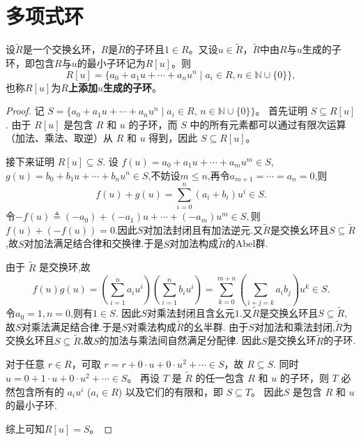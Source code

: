\documentclass[../../main.tex]{subfiles}%
\begin{document}
\section{多项式环}

\begin{theorem}
设\( \widetilde{R} \)是一个交换幺环，\( R \)是\( \widetilde{R} \)的子环且\( 1 \in R \)。又设\( u \in \widetilde{R} \)，\( \widetilde{R} \)中由\( R \)与\( u \)生成的子环，即包含\( R \)与\( u \)的最小子环记为\( R[u] \)。则
\[
R[u] = \{a_0 + a_1 u + \cdots + a_n u^n \mid a_i \in R, n \in \mathbb{N}\cup\{0\}\},
\]
也称\( R[u] \)为\textbf{\( R \)上添加\( u \)生成的子环}。
\end{theorem}
\begin{proof}
记 $S = \{a_0 + a_1 u + \cdots + a_n u^n \mid a_i \in R, \,  n \in \mathbb{N}\cup\{0\}\}$。
首先证明 $S \subseteq R[u]$.
由于 $R[u]$ 是包含 $R$ 和 $u$ 的子环，而 $S$ 中的所有元素都可以通过有限次运算（加法、乘法、取逆）从 $R$ 和 $u$ 得到，因此 $S \subseteq R[u]$。

接下来证明 $R[u] \subseteq S$.
设 $f(u) = a_0 + a_1 u + \cdots + a_m u^m \in S$,$g(u) = b_0 + b_1 u + \cdots + b_n u^n \in S$,不妨设$m\leqslant n$,再令$a_{m+1}=\cdots=a_n=0$,则
$$f(u) + g(u) = \sum_{i=0}^n (a_i + b_i)u^i \in S.$$
令$-f(u) \triangleq  (-a_0) + (-a_1)u + \cdots + (-a_m)u^m \in S,$则$f(u)+(-f(u))=0.$因此$S$对加法封闭且有加法逆元.又$\widetilde{R}$是交换幺环且$S\subseteq \widetilde{R}$,故$S$对加法满足结合律和交换律.于是$S$对加法构成$\widetilde{R}$的Abel群.

由于 $\widetilde{R}$ 是交换环,故
$$
f\left( u \right) g\left( u \right) =\left( \sum_{i=1}^n{a_iu^i} \right) \left( \sum_{i=1}^n{b_iu^i} \right) =\sum_{k=0}^{m+n}{\left( \sum_{i+j=k}{a_ib_j} \right) u^k}\in S.
$$
令$a_0=1,n=0$,则有$1\in S.$
因此$S$对乘法封闭且含幺元$1$.又$\widetilde{R}$是交换幺环且$S\subseteq \widetilde{R}$,故$S$对乘法满足结合律.于是$S$对乘法构成$\widetilde{R}$的幺半群.
由于$S$对加法和乘法封闭,$\widetilde{R}$为交换幺环且$S\subseteq \widetilde{R}$,故$S$的加法与乘法间自然满足分配律.
因此$S$是交换幺环$\widetilde{R}$的子环.

对于任意 $r \in R$，可取 $r = r + 0\cdot u + 0\cdot u^2 + \cdots \in S$，故 $R \subseteq S$.
同时 $u = 0 + 1\cdot u + 0\cdot u^2 + \cdots \in S$。
再设 $T$ 是 $\widetilde{R}$ 的任一包含 $R$ 和 $u$ 的子环，则 $T$ 必然包含所有的 $a_i u^i$ ($a_i \in R$) 以及它们的有限和，即 $S \subseteq T$。
因此$S$ 是包含 $R$ 和 $u$ 的最小子环.

综上可知$R[u] = S$。
\end{proof}
\end{document}
